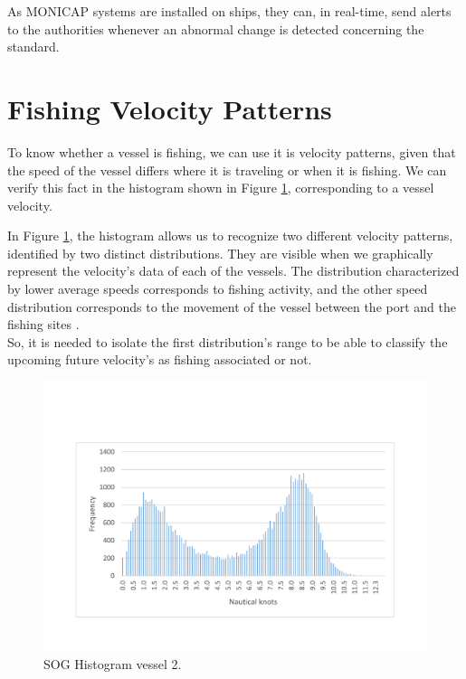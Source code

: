 As MONICAP systems are installed on ships, they can, in real-time, send alerts to the authorities whenever an abnormal change is detected concerning the standard.


\section{Fishing Velocity Patterns} %
\label{sub:fishing_velocity_patterns}

To know whether a vessel is fishing, we can use it is velocity patterns, given that the speed of the vessel differs where it is traveling or when it is fishing. We can verify this fact in the histogram shown in Figure \ref{fig:histogram_vessel2}, corresponding to a vessel velocity.

In Figure \ref{fig:histogram_vessel2}, the histogram allows us to recognize two different velocity patterns, identified by two distinct distributions. They are visible when we graphically represent the velocity's data of each of the vessels. The distribution characterized by lower average speeds corresponds to fishing activity, and the other speed distribution corresponds to the movement of the vessel between the port and the fishing sites \cite{MappingFishing}. \\
So, it is needed to isolate the first distribution's range to be able to classify the upcoming future velocity's as fishing associated or not.
\begin{figure}[H]
\centering
\includegraphics[trim=0 50 0 50, width=0.8\linewidth]{Chapters/img/hist_vessel2.pdf}
\caption{SOG Histogram vessel 2.}
\label{fig:histogram_vessel2}
\end{figure}


